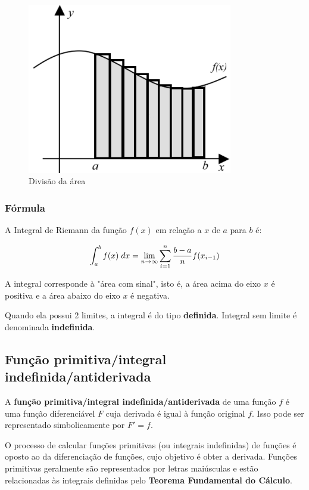 \begin{figure}[H]
	\centering
	\includegraphics[width=0.8\textwidth]{./Imagens/Integral de Riemann/RI2.png} 
	\caption{Divisão da área}
	\label{fig:RI2}
\end{figure}

\subsubsection{Fórmula}

A Integral de Riemann da função $f(x)$ em relação a $x$ de $a$ para $b$ é: 

\[\large \int_{a}^{b}f(x) \; dx = \lim_{n \rightarrow \infty}\sum_{i=1}^{n} \frac{b-a}{n}f(x_{i-1})\]

A integral corresponde à "área com sinal", isto é, a área acima do eixo $x$ é positiva e a área abaixo do eixo $x$ é negativa.

Quando ela possui 2 limites, a integral é do tipo \textbf{definida}. Integral sem limite é denominada \textbf{indefinida}.

\subsection{Função primitiva/integral indefinida/antiderivada}

A \textbf{função primitiva/integral indefinida/antiderivada} de uma função $f$ é uma função diferenciável $F$ cuja derivada é igual à função original $f$. Isso pode ser representado simbolicamente por $F' = f$.

O processo de calcular funções primitivas (ou integrais indefinidas) de funções é oposto ao da diferenciação de funções, cujo objetivo é obter a derivada. Funções primitivas geralmente são representados por letras maiúsculas e estão relacionadas às integrais definidas pelo \textbf{Teorema Fundamental do Cálculo}.

